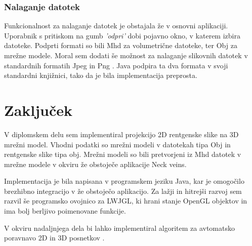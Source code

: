 \documentclass[a4paper, 12pt]{book}
\begin{document}
\subsection{Nalaganje datotek}
Funkcionalnost za nalaganje datotek je obstajala že v osnovni aplikaciji. Uporabnik s pritiskom na gumb \emph{'odpri'} dobi pojavno okno, v katerem izbira datoteke. Podprti formati so bili Mhd za volumetrične datoteke, ter Obj za mrežne modele. Moral sem dodati še možnost za nalaganje slikovnih datotek v standardnih formatih Jpeg in Png \cite{png}. Java podpira ta dva formata v svoji standardni knjižnici, tako da je bila implementacija preprosta.

\chapter{Zaključek}
V diplomskem delu sem implementiral projekcijo 2D rentgenske slike na 3D mrežni model. Vhodni podatki so mrežni modeli v datotekah tipa Obj in rentgenske slike tipa obj. Mrežni modeli so bili pretvorjeni iz Mhd datotek v mrežne modele v okviru že obstoječe aplikacije Neck veins.

Implementacija je bila napisana v programskem jeziku Java, kar je omogočilo brezhibno integracijo v že obstoječo aplikacijo. Za lažji in hitrejši razvoj sem razvil še programsko ovojnico za LWJGL, ki hrani stanje OpenGL objektov in ima bolj berljivo poimenovane funkcije.

V okviru nadaljnjega dela bi lahko implementiral algoritem za avtomatsko poravnavo 2D in 3D posnetkov \cite{6507588}.



\end{document}

